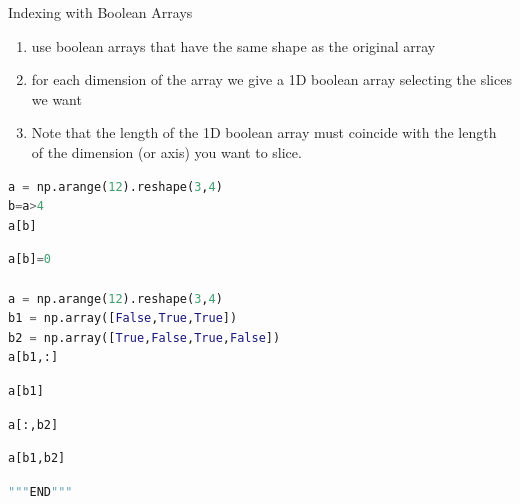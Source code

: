 \documentclass[ignorenonframetext,11pt,xcolor=dvipsnames,hyperref={colorlinks,allcolors=.,urlcolor=blue, citecolor=violet, bookmarksdepth=4},aspectratio=1610]{beamer}
\providecommand{\tightlist}{%
  \setlength{\itemsep}{0pt}\setlength{\parskip}{0pt}}
\begin{document}
\begin{frame}[fragile]{Indexing with Boolean Arrays}
\protect\hypertarget{indexing-with-boolean-arrays}{}

\begin{enumerate}
\tightlist
\item
  use boolean arrays that have the same shape as the original array
\item
  for each dimension of the array we give a 1D boolean array selecting
  the slices we want
\item
  Note that the length of the 1D boolean array must coincide with the
  length of the dimension (or axis) you want to slice.
\end{enumerate}

\begin{lstlisting}[language=Python]
a = np.arange(12).reshape(3,4)
b=a>4
a[b]
\end{lstlisting}

\begin{lstlisting}[language=Python]
a[b]=0

a = np.arange(12).reshape(3,4)
b1 = np.array([False,True,True])
b2 = np.array([True,False,True,False])
a[b1,:]
\end{lstlisting}

\begin{lstlisting}[language=Python]
a[b1]
\end{lstlisting}

\begin{lstlisting}[language=Python]
a[:,b2]
\end{lstlisting}

\begin{lstlisting}[language=Python]
a[b1,b2]
\end{lstlisting}

\begin{lstlisting}[language=Python]
"""END"""
\end{lstlisting}

\end{frame}
\end{document}
